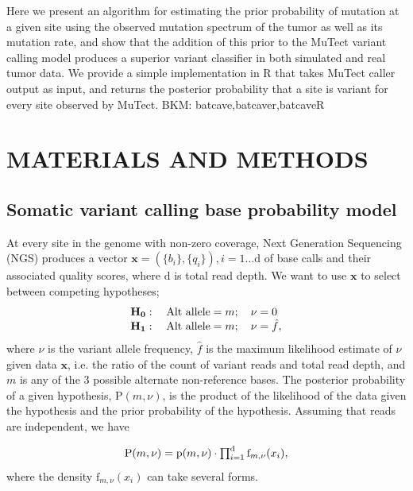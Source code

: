 \documentclass[a4,center,fleqn]{NAR}
\newcommand{\bkmcomment}[1]{{\color{blue}BKM: #1}}
\begin{document}
Here we present an algorithm for estimating the prior probability of mutation at a given site using the observed mutation spectrum of the tumor as well as its mutation rate, and show that the addition of this prior to the MuTect variant calling model produces a superior variant classifier in both simulated and real tumor data.
We provide a simple implementation in R that takes MuTect caller output as input, and returns the posterior probability that a site is variant for every site observed by MuTect. \bkmcomment{batcave,batcaver,batcaveR}

\section{MATERIALS AND METHODS}
\subsection{Somatic variant calling base probability model}

At every site in the genome with non-zero coverage, Next Generation Sequencing (NGS) produces a vector $\mathbf{x}  = (\{b_i\},\{q_i\}), i = 1\dots \mathrm{d}$ of base calls and their associated quality scores, where $\mathrm{d}$ is total read depth.
We want to use $\mathbf{x}$ to select between competing hypotheses;
\begin{equation}
  \label{eqn:hypothesis}
$$
  \begin{array}{l}
    \mathbf{H_0}:\quad \textrm{Alt allele} = m;\quad\nu = 0\\
    \mathbf{H_1}:\quad \textrm{Alt allele} = m;\quad\nu = \hat{f},
  \end{array}
$$
\end{equation}
where $\nu$ is the variant allele frequency, $\hat{f}$ is the maximum likelihood estimate of $\nu$ given data $\mathbf{x}$, i.e. the ratio of the count of variant reads and total read depth, and $m$ is any of the 3 possible alternate non-reference bases.
The posterior probability of a given hypothesis, $\mathrm{P}(m,\nu)$, is the product of the likelihood of the data given the hypothesis and the prior probability of the hypothesis. 
Assuming that reads are independent, we have

\begin{equation}
  \label{eqn:1}
$$
  \mathrm{P}(m,\nu) = \mathrm{p}(m,\nu) \cdot \prod_{i=1}^{\mathrm{d}} \textrm{f}_{m,\nu}(x_i),
$$
\end{equation}
where the density $\textrm{f}_{m,\nu}(x_i)$ can take several forms.
\end{document}
